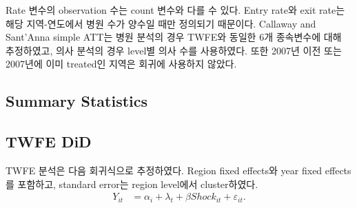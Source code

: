 \documentclass[a4paper, 10pt]{article}
\begin{document}
        Rate 변수의 observation 수는 count 변수와 다를 수 있다.
        Entry rate와 exit rate는 해당 지역-연도에서 병원 수가 양수일 때만 정의되기 때문이다.
        Callaway and Sant'Anna simple ATT는 병원 분석의 경우 TWFE와 동일한 6개 종속변수에 대해 추정하였고,
        의사 분석의 경우 level별 의사 수를 사용하였다.
        또한 2007년 이전 또는 2007년에 이미 treated인 지역은
        회귀에 사용하지 않았다.

        \subsection{Summary Statistics}
            \begin{table}[H]
                \centering
                \caption{30km summary statistics: doctor sample}
                
            \end{table}

        \subsection{TWFE DiD}
            TWFE 분석은 다음 회귀식으로 추정하였다.
            Region fixed effects와 year fixed effects를 포함하고,
            standard error는 region level에서 cluster하였다.
            \begin{align*}
                Y_{it}
                &=
                \alpha_i
                +
                \lambda_t
                +
                \beta Shock_{it}
                +
                \varepsilon_{it}.
            \end{align*}

            \begin{table}[H]
                \centering
                \caption{TWFE DiD 의원}
                
            \end{table}

            \begin{table}[H]
                \centering
                \caption{TWFE DiD 병원}
                
            \end{table}

            \begin{table}[H]
                \centering
                \caption{TWFE DiD 종합병원}
                
            \end{table}
\end{document}
